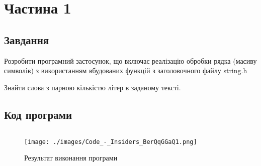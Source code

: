\section{Частина 1}
\label{sec:task1}

\subsection{Завдання}
\label{subsec:task1_task}

Розробити програмний застосунок, що включає реалізацію
обробки рядка (масиву символів) з використанням вбудованих
функцій з заголовочного файлу string.h

Знайти слова з парною кількістю літер в заданому тексті.

\subsection{Код програми}
\label{subsec:task1_code}
\inputminted{cpp}{../src/task1.cpp}

\begin{figure}[!ht]
    \centering
    \texttt{[image: ./images/Code\_-\_Insiders\_BerQqGGaQ1.png]}
    \caption{Результат виконання програми}
    \label{fig:task1_exec}
\end{figure}
